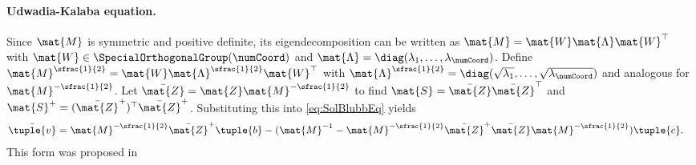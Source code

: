 \paragraph*{Udwadia-Kalaba equation.}
Since $\mat{M}$ is symmetric and positive definite, its eigendecomposition can be written as $\mat{M} = \mat{W} \mat{\Lambda} \mat{W}^\top$ with $\mat{W}\in\SpecialOrthogonalGroup(\numCoord)$ and $\mat{\Lambda} = \diag(\lambda_1, \ldots, \lambda_{\numCoord})$.
Define $\mat{M}^{\sfrac{1}{2}} = \mat{W} \mat{\Lambda}^{\sfrac{1}{2}} \mat{W}^\top$ with $\mat{\Lambda}^{\sfrac{1}{2}} = \diag(\sqrt{\lambda_1}, \ldots, \sqrt{\lambda_{\numCoord}})$ and analogous for $\mat{M}^{-\sfrac{1}{2}}$.
Let $\bar{\mat{Z}} = \mat{Z} \mat{M}^{-\sfrac{1}{2}}$ to find $\mat{S} = \bar{\mat{Z}}\bar{\mat{Z}}^\top$ and $\mat{S}^+ = (\bar{\mat{Z}}^+)^\top \bar{\mat{Z}}^+$.
Substituting this into \eqref{eq:SolBlubbEq} yields
\begin{align}
 \bar{\tuple{v}} %
 &= \mat{M}^{-\sfrac{1}{2}} \bar{\mat{Z}}^+ \tuple{b} - (\mat{M}^{-1} - \mat{M}^{-\sfrac{1}{2}} \bar{\mat{Z}}^+ \bar{\mat{Z}} \mat{M}^{-\sfrac{1}{2}}) \tuple{c}. %
\end{align}
This form was proposed in \cite{Udwadia:GeneralForm}

